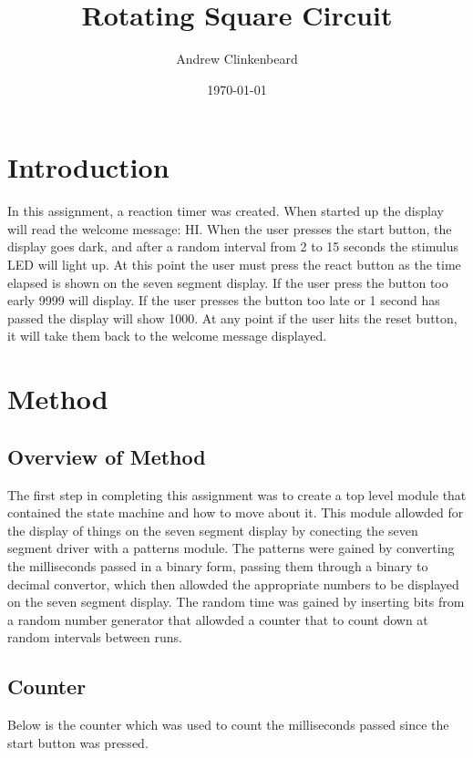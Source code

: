 \documentclass[12pt]{article}
\title{Rotating Square Circuit}
\author{Andrew Clinkenbeard}
\date{\today}
\newcommand{\Verilog}[2][]{%
	
}
\begin{document}
\maketitle
\section{Introduction}

In this assignment, a reaction timer was created. When started up the display will read the welcome message: HI. When the user presses the start button, the display goes dark, and after a random interval from 2 to 15 seconds the stimulus LED will light up. At this point the user must press the react button as the time elapsed is shown on the seven segment display. If the user press the button too early 9999 will display. If the user presses the button too late or 1 second has passed the display will show 1000. At any point if the user hits the reset button, it will take them back to the welcome message displayed. 





\section{Method}
\subsection{Overview of Method}
The first step in completing this assignment was to create a top level module that contained the state machine and how to move about it. This module allowded for the display of things on the seven segment display by conecting the seven segment driver with a patterns module. The patterns were gained by converting the milliseconds passed in a binary form, passing them through a binary to decimal convertor, which then allowded the appropriate numbers to be displayed on the seven segment display. The random time was gained by inserting bits from a random number generator that allowded a counter that to count down at random intervals between runs.
\Verilog[firstline=4]{./state.sv}

\subsection{Counter}
Below is the counter which was used to count the milliseconds passed since the start button was pressed.
\Verilog[firstline=23]{./count_up.sv}
\end{document}
